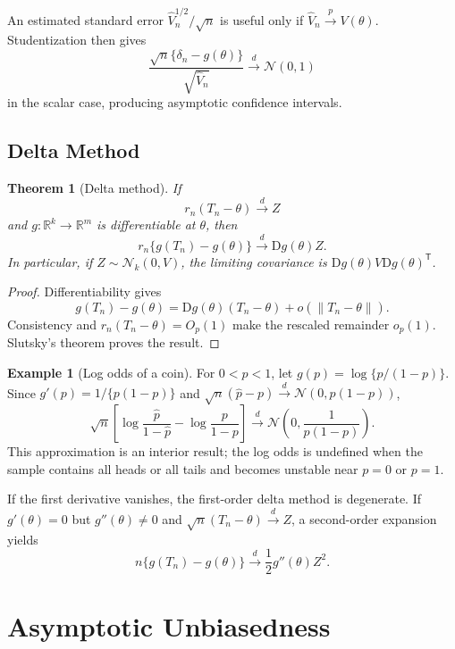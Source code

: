 \documentclass[12pt,oneside]{book}
\numberwithin{equation}{section}
\theoremstyle{definition}
\newtheorem{example}{Example}[section]
\theoremstyle{plain}
\newtheorem{theorem}{Theorem}[section]
\theoremstyle{remark}
\newcommand{\R}{\mathbb{R}}
\newcommand{\convd}{\overset{d}{\to}}
\newcommand{\convp}{\overset{p}{\to}}
\newcommand{\norm}[1]{\left\lVert #1 \right\rVert}
\newcommand{\Normal}{\mathcal{N}}
\begin{document}
An estimated standard error $\widehat V_n^{1/2}/\sqrt n$ is useful only if
$\widehat V_n\convp V(\theta)$.  Studentization then gives
\[
    \frac{\sqrt n\{\delta_n-g(\theta)\}}{\sqrt{\widehat V_n}}
    \convd\Normal(0,1)
\]
in the scalar case, producing asymptotic confidence intervals.

\subsection{Delta Method}

\begin{theorem}[Delta method]
If
\[
    r_n(T_n-\theta)\convd Z
\]
and $g:\R^k\to\R^m$ is differentiable at $\theta$, then
\begin{equation}
    r_n\{g(T_n)-g(\theta)\}
    \convd \mathrm Dg(\theta)Z.
    \label{eq:delta-method}
\end{equation}
In particular, if $Z\sim\Normal_k(0,V)$, the limiting covariance is
$\mathrm Dg(\theta)V\mathrm Dg(\theta)^\mathsf T$.
\end{theorem}

\begin{proof}
Differentiability gives
\[
 g(T_n)-g(\theta)
 =\mathrm Dg(\theta)(T_n-\theta)+o(\norm{T_n-\theta}).
\]
Consistency and $r_n(T_n-\theta)=O_p(1)$ make the rescaled remainder $o_p(1)$.
Slutsky's theorem proves the result.
\end{proof}

\begin{example}[Log odds of a coin]
For $0<p<1$, let $g(p)=\log\{p/(1-p)\}$.  Since
$g'(p)=1/\{p(1-p)\}$ and
$\sqrt n(\widehat p-p)\convd\Normal(0,p(1-p))$,
\[
 \sqrt n\left[
 \log\frac{\widehat p}{1-\widehat p}
 -\log\frac p{1-p}\right]
 \convd\Normal\left(0,\frac1{p(1-p)}\right).
\]
This approximation is an interior result; the log odds is undefined when the
sample contains all heads or all tails and becomes unstable near $p=0$ or
$p=1$.
\end{example}

If the first derivative vanishes, the first-order delta method is degenerate.
If $g'(\theta)=0$ but $g''(\theta)\neq0$ and
$\sqrt n(T_n-\theta)\convd Z$, a second-order expansion yields
\[
    n\{g(T_n)-g(\theta)\}
    \convd\frac12g''(\theta)Z^2.
\]

\section{Asymptotic Unbiasedness}
\end{document}
